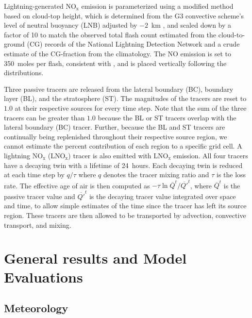 Lightning-generated NO$_\mathrm{x}$ emission is parameterized using a modified \citet{Price:1992wb}
method based on cloud-top height, which is determined from the G3 convective scheme's level of neutral buoyancy 
(LNB) adjusted by $-2$~km \citep{Wong:2013vn}, and scaled down by a factor of 10 to match the observed total
flash count estimated from the cloud-to-ground (CG) records of the National Lightning Detection
Network \citep[NLDN;][]{Cummins:2009aa} and a crude estimate of the CG-fraction from the
\citet{Boccippio:2001ys} climatology. The NO emission is set to 350~moles per flash, consistent
with \citet{Barth:2012qf}, and is placed vertically following the \citet{Ott:2010lo} distributions.

Three passive tracers are released from the lateral boundary (BC), boundary layer (BL), and
the stratosphere (ST). The magnitudes of the tracers are reset to $1.0$ at their respective sources for every
time step. Note that the sum of the three tracers can be greater than $1.0$ because the BL or ST tracers
overlap with the lateral boundary (BC) tracer. Further, because the BL and ST tracers are continually
being replenished throughout their respective source region, we cannot estimate the percent contribution
of each region to a specific grid cell.
A lightning NO$_\mathrm{x}$ (LNO$_\mathrm{x}$) tracer is also emitted with
LNO$_\mathrm{x}$ emission. All four tracers have a decaying twin with a lifetime of 24~hours.
Each decaying twin is reduced at each time step by $q/\tau$ where $q$ denotes the tracer mixing ratio
and $\tau$ is the loss rate. The effective age of air is then computed as $-\tau\ln\overline{Q}^{t}/\overline{Q'}^{t}$,
where $\overline{Q}^{t}$ is the passive tracer value and $\overline{Q'}^{t}$ is the decaying tracer value
integrated over space and time, to allow simple estimates of the time since the tracer has left its source region.
These tracers are then allowed to be transported by advection, convective transport, and mixing.

\section{General results and Model Evaluations}\label{sect:results}

\subsection{Meteorology}\label{sect:val/met}

